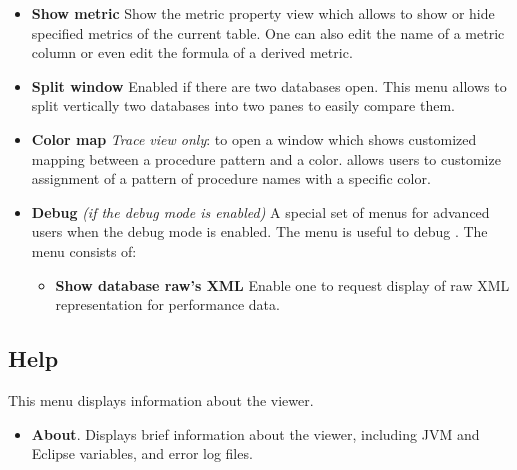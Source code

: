 \documentclass[english]{article}
\begin{document}
\begin{itemize}
 \item \textbf{Show metric}
Show the metric property view which allows to show or hide specified metrics of the current table.
One can also edit the name of a metric column or even edit the formula of a derived metric.

 \item \textbf{Split window}
 Enabled if there are two databases open. This menu allows to split vertically two databases into two panes to easily compare them.

 \item \textbf{Color map} \emph{Trace view only}: to open a window which shows customized mapping between a procedure pattern and a color.  allows users to customize assignment of a pattern of procedure names with a specific color.

 \item \textbf{Debug} \emph{(if the debug mode is enabled)}
 A special set of menus for advanced users when the debug mode is enabled. The menu is useful to debug . The menu consists of:

   \begin{itemize}
     \item \textbf{Show database raw's XML}
        Enable one to request display of raw XML representation for performance data.
  \end{itemize}

\end{itemize}


\subsection{Help}

This menu displays information about the viewer.
\begin{itemize}

\item \textbf{About}.
  Displays brief information about the viewer, including JVM and Eclipse variables, and error log files.

\end{itemize}



\end{document}
